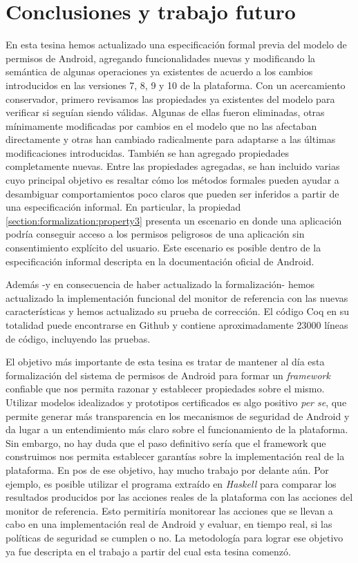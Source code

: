 \chapter{Conclusiones y trabajo futuro}
\label{chapter:conclusion}

En esta tesina hemos actualizado una especificación formal previa del modelo de permisos de
Android\cite{luna-cleiej,betarte-2016}, agregando funcionalidades nuevas y modificando la semántica
de algunas operaciones ya existentes de acuerdo a los cambios introducidos en las versiones 7, 8, 9
y 10 de la plataforma. Con un acercamiento conservador, primero revisamos las propiedades ya
existentes del modelo para verificar si seguían siendo válidas. Algunas de ellas fueron eliminadas,
otras mínimamente modificadas por cambios en el modelo que no las afectaban directamente y otras han
cambiado radicalmente para adaptarse a las últimas modificaciones introducidas. También se han
agregado propiedades completamente nuevas. Entre las propiedades agregadas, se han incluido varias
cuyo principal objetivo es resaltar cómo los métodos formales pueden ayudar a desambiguar
comportamientos poco claros que pueden ser inferidos a partir de una especificación informal. En
particular, la propiedad \ref{section:formalization:property3} presenta un escenario en donde una
aplicación podría conseguir acceso a los permisos peligrosos de una aplicación sin consentimiento
explícito del usuario. Este escenario es posible dentro de la especificación informal descripta en
la documentación oficial de Android.

Además -y en consecuencia de haber actualizado la formalización- hemos actualizado la implementación
funcional del monitor de referencia con las nuevas características y hemos actualizado su prueba de
corrección. El código Coq en su totalidad puede encontrarse en Github\cite{github-code} y contiene
aproximadamente 23000 líneas de código, incluyendo las pruebas.

El objetivo más importante de esta tesina es tratar de mantener al día esta formalización del
sistema de permisos de Android para formar un \textit{framework} confiable que nos permita razonar y
establecer propiedades sobre el mismo. Utilizar modelos idealizados y prototipos certificados es
algo positivo \textit{per se}, que permite generar más transparencia en los mecanismos de seguridad
de Android y da lugar a un entendimiento más claro sobre el funcionamiento de la plataforma. Sin
embargo, no hay duda que el paso definitivo sería que el framework que construimos nos permita
establecer garantías sobre la implementación real de la plataforma. En pos de ese objetivo, hay
mucho trabajo por delante aún. Por ejemplo, es posible utilizar el programa extraído en
\textit{Haskell} para comparar los resultados producidos por las acciones reales de la plataforma
con las acciones del monitor de referencia. Esto permitiría monitorear las acciones que se llevan a
cabo en una implementación real de Android y evaluar, en tiempo real, si las políticas de seguridad
se cumplen o no. La metodología para lograr ese objetivo ya fue descripta en el trabajo a partir del
cual esta tesina comenzó\cite{luna-cleiej}.

